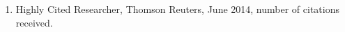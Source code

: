 

\begin{enumerate}
\item
  Highly Cited Researcher, Thomson Reuters, June 2014, number of citations received.
\end{enumerate}
